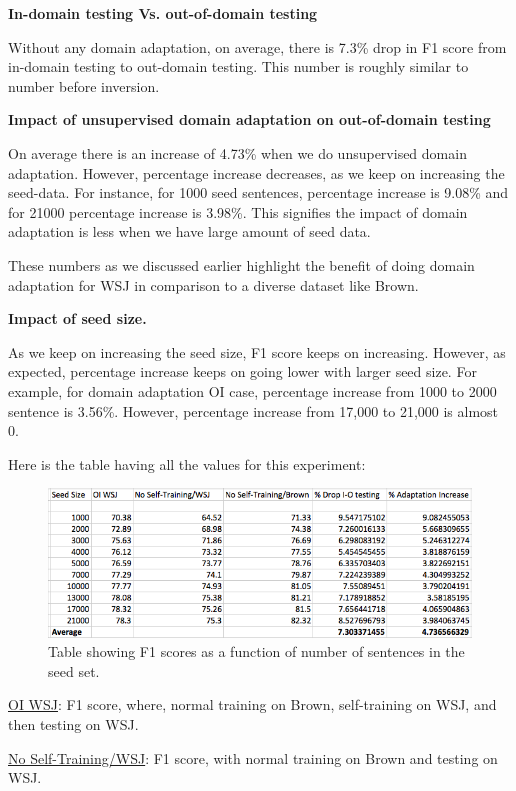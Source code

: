 \textbf {In-domain testing Vs. out-of-domain testing}

Without any domain adaptation, on average, there is 7.3\% drop in F1 score from in-domain testing to out-domain testing. This number is roughly similar to number before inversion.

\textbf {Impact of unsupervised domain adaptation on out-of-domain testing}

On average there is an increase of 4.73\% when we do unsupervised domain adaptation. However, percentage increase decreases, as we keep on increasing the seed-data. For instance, for 1000 seed sentences, percentage increase is 9.08\% and for 21000 percentage increase is 3.98\%. This signifies the impact of domain adaptation is less when we have large amount of seed data. 

These numbers as we discussed earlier highlight the benefit of doing domain adaptation for WSJ in comparison to a diverse dataset like Brown.

\textbf {Impact of seed size.}

As we keep on increasing the seed size, F1 score keeps on increasing. However, as expected, percentage increase keeps on going lower with larger seed size. For example, for domain adaptation OI case, percentage increase from 1000 to 2000 sentence is 3.56\%. However, percentage increase from 17,000 to 21,000 is almost 0. 

Here is the table having all the values for this experiment:

\begin{figure}[ht!]
\centering
\includegraphics[width=140mm]{exp3-snapshot.png}
\caption{Table showing F1 scores as a function of number of sentences in the seed set. }
\label{accuracy}
\end{figure}

\underline{OI WSJ}: F1 score, where, normal training on Brown, self-training on WSJ, and then testing on WSJ. 

\underline{No Self-Training/WSJ}:  F1 score, with normal training on Brown and testing on WSJ. 

